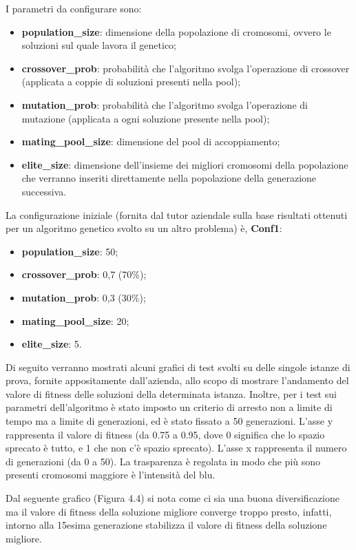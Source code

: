 I parametri da configurare sono:
\begin{itemize}
	\item\textbf{population\_size}: dimensione della popolazione di cromosomi, ovvero le soluzioni sul quale lavora il genetico;
	\item\textbf{crossover\_prob}: probabilità che l'algoritmo svolga l'operazione di crossover (applicata a coppie di soluzioni presenti nella pool);
	\item\textbf{mutation\_prob}: probabilità che l'algoritmo svolga l'operazione di mutazione (applicata a ogni soluzione presente nella pool);
	\item\textbf{mating\_pool\_size}: dimensione del pool di accoppiamento;
	\item\textbf{elite\_size}: dimensione dell'insieme dei migliori cromosomi della popolazione che verranno inseriti direttamente nella popolazione della generazione successiva.
\end{itemize}

\noindent La configurazione iniziale (fornita dal tutor aziendale sulla base risultati ottenuti per un algoritmo genetico svolto su un altro problema) è, \textbf{Conf1}:
\begin{itemize}
	\item\textbf{population\_size}: 50;
	\item\textbf{crossover\_prob}: 0,7 (70\%);
	\item\textbf{mutation\_prob}: 0,3 (30\%);
	\item\textbf{mating\_pool\_size}: 20;
	\item\textbf{elite\_size}: 5.
\end{itemize}

Di seguito verranno mostrati alcuni grafici di test svolti su delle singole istanze di prova, fornite appositamente dall'azienda, allo scopo di mostrare l'andamento del valore di fitness delle soluzioni della determinata istanza. Inoltre, per i test sui parametri dell'algoritmo è stato imposto un criterio di arresto non a limite di tempo ma a limite di generazioni, ed è stato fissato a 50 generazioni. 
L'asse y rappresenta il valore di fitness (da 0.75 a 0.95, dove 0 significa che lo spazio sprecato è tutto, e 1 che non c'è spazio sprecato). L'asse x rappresenta il numero di generazioni (da 0 a 50).
La trasparenza è regolata in modo che più sono presenti cromosomi maggiore è l'intensità del blu.

Dal seguente grafico (Figura 4.4) si nota come ci sia una buona diversificazione ma il valore di fitness della soluzione migliore converge troppo presto, infatti, intorno alla 15esima generazione stabilizza il valore di fitness della soluzione migliore. 

